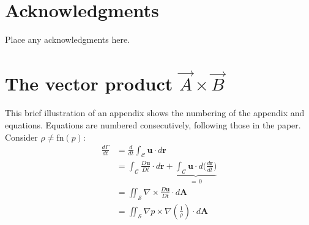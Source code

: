 \documentclass[captionpatch,colorlinks,upint,subscriptcorrection,varvw,mathalfa=cal=boondoxo,german]{asmeconf}
\begin{document}
\section*{Acknowledgments}
Place any acknowledgments here.



\nocite{*}%



\appendix


\section[The Vector Product A\times B]{The vector product $\vec{A}\times\vec{B}$}\label{appendix:a}

This brief illustration of an appendix shows the numbering of the appendix and equations. Equations are numbered
consecutively, following those in the paper. Consider $\rho \neq \textrm{fn}(p)$:
\begin{align}
\frac{d\Gamma}{dt} &{}= \frac{d}{dt} \int_{\mathcal{C}} \mathbf{u} \cdot d\mathbf{r}\\
				   &{}= \int_{\mathcal{C}} \frac{D\mathbf{u}}{Dt} \cdot d\mathbf{r} + \underbrace{\int_{\mathcal{C}} \mathbf{u}\cdot d\biggl( \frac{d\mathbf{r}}{dt}\biggr)}_{=\, 0} \\[-2pt]
                   &{}= \iint_{\mathcal{S}} \nabla \times \frac{D\mathbf{u}}{Dt}  \cdot d\mathbf{A}\\
                   &{}= \iint_{\mathcal{S}}  \nabla p \times \nabla \left( \frac{1}{\rho}\right) \cdot d\mathbf{A}
\end{align}
\end{document}
